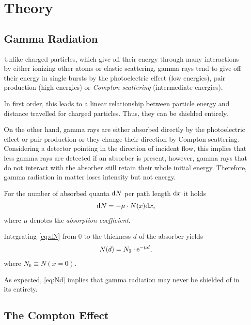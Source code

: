 \chapter{Theory}

\section{Gamma Radiation}
Unlike charged particles, which give off their energy through many interactions by either ionizing other atoms or elastic scattering, gamma rays tend to give off their energy in single bursts by the photoelectric effect (low energies), pair production (high energies) or \textit{Compton scattering} (intermediate energies).

In first order, this leads to a linear relationship between particle energy and distance travelled for charged particles. Thus, they can be shielded entirely.

On the other hand, gamma rays are either absorbed directly by the photoelectric effect or pair production or they change their direction by Compton scattering. Considering a detector pointing in the direction of incident flow, this implies that less gamma rays are detected if an absorber is present, however, gamma rays that do not interact with the absorber still retain their whole initial energy. Therefore, gamma radiation in matter loses intensity but not energy.

For the number of absorbed quanta $\text{d} N$ per path length $\text{d} x$ it holds
\begin{equation}\label{eq:dN}
	\text{d} N = -\mu\cdot N(x)\text{d} x,
\end{equation}
where $\mu$ denotes the \textit{absorption coefficient}.

Integrating \autoref{eq:dN} from 0 to the thickness $d$ of the absorber yields
\begin{equation}\label{eq:Nd}
	N(d) = N_0\cdot\mathrm{e}^{-\mu d},
\end{equation}
where $N_0\equiv N(x=0)$.

As expected, \autoref{eq:Nd} implies that gamma radiation may never be shielded of in its entirety.

\section{The Compton Effect}
